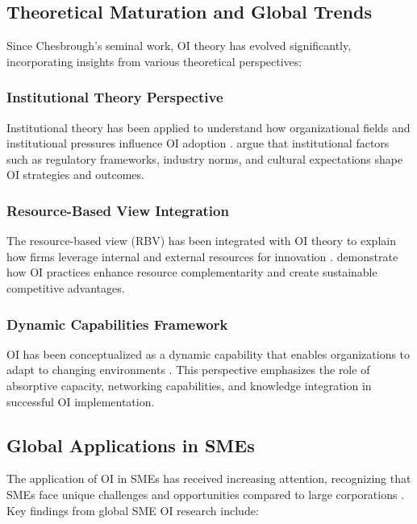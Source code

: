\subsection{Theoretical Maturation and Global Trends}

Since Chesbrough's seminal work, OI theory has evolved significantly, incorporating insights from various theoretical perspectives:

\subsubsection{Institutional Theory Perspective}
Institutional theory has been applied to understand how organizational fields and institutional pressures influence OI adoption \citep{phillips2000discourse}. \cite{west2014leveraging} argue that institutional factors such as regulatory frameworks, industry norms, and cultural expectations shape OI strategies and outcomes.

\subsubsection{Resource-Based View Integration}
The resource-based view (RBV) has been integrated with OI theory to explain how firms leverage internal and external resources for innovation \citep{lichtenthaler2009outbound}. \cite{huizingh2011open} demonstrate how OI practices enhance resource complementarity and create sustainable competitive advantages.

\subsubsection{Dynamic Capabilities Framework}
OI has been conceptualized as a dynamic capability that enables organizations to adapt to changing environments \citep{teixeira2012dynamic}. This perspective emphasizes the role of absorptive capacity, networking capabilities, and knowledge integration in successful OI implementation.

\subsection{Global Applications in SMEs}

The application of OI in SMEs has received increasing attention, recognizing that SMEs face unique challenges and opportunities compared to large corporations \citep{van2010open}. Key findings from global SME OI research include:

